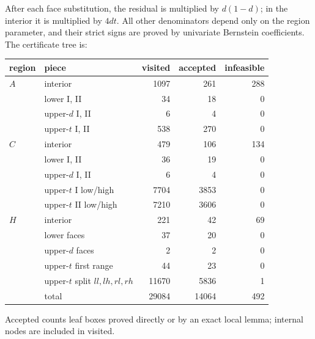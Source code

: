 \documentclass[11pt]{article}
\begin{document}
After each face substitution, the residual is multiplied by $d(1-d)$; in
the interior it is multiplied by $4dt$.  All other denominators depend only
on the region parameter, and their strict signs are proved by univariate
Bernstein coefficients.  The certificate tree is:
\begin{center}
\begin{tabular}{llrrr}
\toprule
region&piece&visited&accepted&infeasible\\
\midrule
$A$&interior&1097&261&288\\
&lower I, II&34&18&0\\
&upper-$d$ I, II&6&4&0\\
&upper-$t$ I, II&538&270&0\\
\midrule
$C$&interior&479&106&134\\
&lower I, II&36&19&0\\
&upper-$d$ I, II&6&4&0\\
&upper-$t$ I low/high&7704&3853&0\\
&upper-$t$ II low/high&7210&3606&0\\
\midrule
$H$&interior&221&42&69\\
&lower faces&37&20&0\\
&upper-$d$ faces&2&2&0\\
&upper-$t$ first range&44&23&0\\
&upper-$t$ split $ll,lh,rl,rh$&11670&5836&1\\
\midrule
&total&29084&14064&492\\
\bottomrule
\end{tabular}
\end{center}
Accepted counts leaf boxes proved directly or by an exact local lemma;
internal nodes are included in visited.
\end{document}
